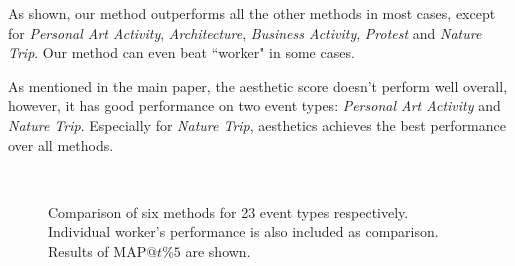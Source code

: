 \documentclass[10pt,twocolumn,letterpaper]{article}
\begin{document}
As shown, our method outperforms all the other methods in most cases, except for \textit{Personal Art Activity}, \textit{Architecture},  \textit{Business Activity},  \textit{Protest} and  \textit{Nature Trip}. Our method can even beat ``worker" in some cases.

As mentioned in the main paper, the aesthetic score doesn't perform well overall, however, it has good performance on two event types: \textit{Personal Art Activity} and \textit{Nature Trip}. Especially for \textit{Nature Trip}, aesthetics achieves the best performance over all methods. 

\begin{figure}[ht]
\begin{center}
\\
\end{center}
\caption{Comparison of six methods for 23 event types respectively. Individual worker's performance is also included as comparison. Results of $\text{MAP}@t\%5$ are shown.}
\label{bar_result_event_type}
\end{figure}
\end{document}
